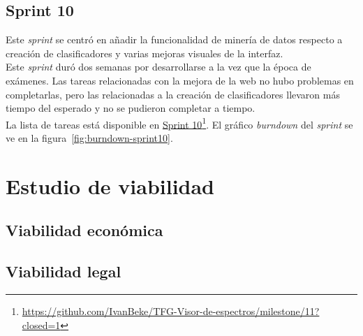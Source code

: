 
\subsection{Sprint 10}
Este \textit{sprint} se centró en añadir la funcionalidad de minería de datos
respecto a creación de clasificadores y varias mejoras visuales de la
interfaz.\\

Este \textit{sprint} duró dos semanas por desarrollarse a la vez que la época de
exámenes. Las tareas relacionadas con la mejora de la web no hubo problemas en
completarlas, pero las relacionadas a la creación de clasificadores llevaron más
tiempo del esperado y no se pudieron completar a tiempo.\\

La lista de tareas está disponible en
\href{https://github.com/IvanBeke/TFG-Visor-de-espectros/milestone/11?closed=1}{Sprint
	10}\footnote{\url{https://github.com/IvanBeke/TFG-Visor-de-espectros/milestone/11?closed=1}}.
El gráfico \textit{burndown} del \textit{sprint} se ve en la
figura~\ref{fig:burndown-sprint10}.\\


\section{Estudio de viabilidad}

\subsection{Viabilidad económica}

\subsection{Viabilidad legal}
